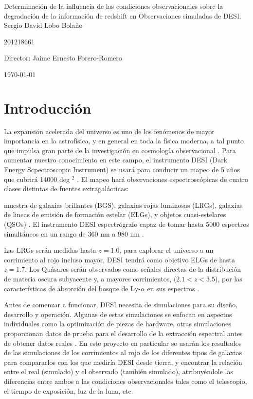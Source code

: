 \documentclass[12pt]{article}
\begin{document}
\begin{center}
\huge
Determinación de la influencia de las condiciones observacionales sobre la degradación de la información de redshift en Observaciones simuladas de DESI.\\
\vspace{3mm}
\Large Sergio David Lobo Bolaño

\large
201218661

\vspace{2mm}
\Large
Director: Jaime Ernesto Forero-Romero


\vspace{2mm}

\today
\end{center}


\section{Introducción}

La expansión acelerada del universo es uno de los fenómenos de mayor importancia en la astrofísica, y en general en toda la física moderna, a tal punto que impulsa gran parte de la investigación en cosmología observacional \cite{Nord:2016plv}. Para aumentar nuestro conocimiento en este campo, el instrumento DESI (Dark Energy Scpectroscopic Instrument) se usará para conducir un mapeo de 5 años que cubrirá 14000 deg $^2$ \cite{Aghamousa:2016zmz}. El mapeo hará observaciones espectroscópicas de cuatro clases distintas de fuentes extragalácticas:

muestra de galaxias brillantes (BGS), galaxias rojas luminosas (LRGs), galaxias de lineas de emisión de formación estelar (ELGs), y objetos cuasi-estelares (QSOs) \cite{Aghamousa:2016zmz}. El instrumento DESI espectrógrafo capaz de tomar hasta 5000 espectros simultáneos en un rango de 360 nm a 980 nm \cite{Aghamousa:2016sne}. 

Las LRGs serán medidas hasta $z = 1.0$, para explorar el universo a un corrimiento al rojo incluso mayor, DESI tendrá como objetivo ELGs de hasta $z = 1.7$. Los Quásares serán observados como señales directas de la distribución de materia oscura subyacente y, a mayores corrimientos, ($2.1<z<3.5$), por las características de absorción del bosque de Ly-$\alpha$ en sus espectros \cite{Aghamousa:2016zmz}. 

Antes de comenzar a funcionar, DESI necesita de simulaciones para su diseño, desarrollo y operación. Algunas de estas simulaciones se enfocan en aspectos individuales como la optimización de piezas de hardware, otras simulaciones proporcionan datos de prueba para el desarrollo de la extracción espectral antes de obtener datos reales \cite{Aghamousa:2016sne}. En este proyecto en particular se usarán los resultados de las simulaciones de los corrimientos al rojo de los diferentes tipos de galaxias para compararlos con los que mediría DESI desde tierra, y encontrar la relación entre el real (simulado) y el observado (también simulado), atribuyéndole las diferencias entre ambos a las condiciones observacionales tales como el telescopio, el tiempo de exposición, luz de la luna, etc. 
\end{document}
